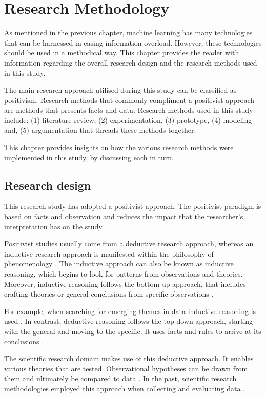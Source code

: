 \chapter{Research Methodology}
\label{chap: Chapter 4}

As mentioned in the previous chapter, machine learning has many technologies that can be harnessed in easing information overload. However, these technologies should be used in a methodical way. This chapter provides the reader with information regarding the overall research design and the research methods used in this study.

The main research approach utilised during this study can be classified as positivism. Research methods that commonly compliment a positivist approach are methods that presents facts and data. Research methods used in this study include: (1) literature review, (2) experimentation, (3) prototype, (4) modeling and, (5) argumentation that threads these methods together.

This chapter provides insights on how the various research methods were implemented in this study, by discussing each in turn.

\section{Research design}

This research study has adopted a positivist approach. The positivist paradigm is based on facts and observation \cite{wilson2014essentials} and reduces the impact that the researcher’s interpretation has on the study.

Positivist studies usually come from a deductive research approach, whereas an inductive research approach is manifested within the philosophy of phenomenology \cite{saunders2007research}. The inductive approach can also be known as inductive reasoning, which begins to look for patterns from observations and theories. Moreover, inductive reasoning follows the bottom-up approach, that includes crafting theories or general conclusions from specific observations \cite{saunders2007research}.

For example, when searching for emerging themes in data inductive reasoning is used \cite{Fereday2006}. In contrast, deductive reasoning follows the top-down approach, starting with the general and moving to the specific. It uses facts and rules to arrive at its conclusions \cite{Fereday2006}.

The scientific research domain makes use of this deductive approach. It enables various theories that are tested. Observational hypotheses can be drawn from them and ultimately be compared to data \cite{bechtel2013philosophy}. In the past, scientific research methodologies employed this approach when collecting and evaluating data \cite{MARSDEN2018A1}.

